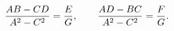 \begin{equation}
{AB-CD\over A^2-C^2}={E\over G}, \qquad {AD-BC\over A^2-C^2}={F\over G}.\label{eq22}
\end{equation}

